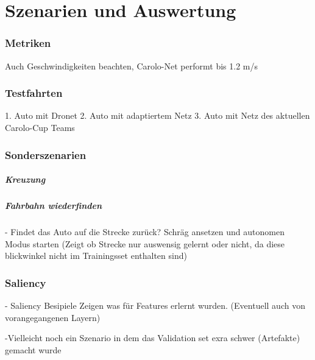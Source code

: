 %
\chapter{Szenarien und Auswertung}

\subsection{Metriken}


Auch Geschwindigkeiten beachten, Carolo-Net performt bis 1.2 m/s
\subsection{Testfahrten}

1. Auto mit Dronet 
2. Auto mit adaptiertem Netz
3. Auto mit Netz des aktuellen Carolo-Cup Teams 

\subsection{Sonderszenarien}

\paragraph{Kreuzung}

\paragraph{Fahrbahn wiederfinden}




- Findet das Auto auf die Strecke zurück? Schräg ansetzen und autonomen Modus starten
(Zeigt ob Strecke nur auswensig gelernt oder nicht, da  diese blickwinkel nicht im Trainingsset enthalten sind)

\subsection{Saliency}
- Saliency Besipiele Zeigen was für Features erlernt wurden. (Eventuell auch von vorangegangenen Layern)

-Vielleicht noch ein Szenario in dem das Validation set exra schwer (Artefakte) gemacht wurde

